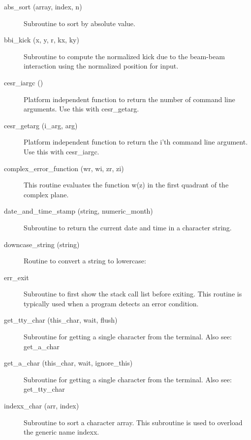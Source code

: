 \begin{description}

\item[abs_sort (array, index, n)] \Newline 
  Subroutine to sort by absolute value.

\item[bbi_kick (x, y, r, kx, ky)] \Newline 
Subroutine to compute the normalized kick due to the beam-beam
interaction using the normalized position for input.

\item[cesr_iargc ()] \Newline 
Platform independent function to return the number of command
line arguments. Use this with cesr_getarg.

\item[cesr_getarg (i_arg, arg)] \Newline 
Platform independent function to return the i'th command
line argument. Use this with cesr_iargc.

\item[complex_error_function (wr, wi, zr, zi)] \Newline 
This routine evaluates the function w(z) in the first quadrant of
the complex plane. 

\item[date_and_time_stamp (string, numeric_month)] \Newline 
Subroutine to return the current date and time in a character string.

\item[downcase_string (string)] \Newline 
Routine to convert a string to lowercase:

\item[err_exit] \Newline 
Subroutine to first show the stack call list before exiting.
This routine is typically used when a program detects an error condition.

\item[get_tty_char (this_char, wait, flush)] \Newline 
Subroutine for getting a single character from the terminal.
Also see: get_a_char

\item[get_a_char (this_char, wait, ignore_this)] \Newline 
Subroutine for getting a single character from the terminal.
Also see: get_tty_char

\item[indexx_char (arr, index)] \Newline 
Subroutine to sort a character array.
This subroutine is used to overload the generic name indexx.


\end{description}
